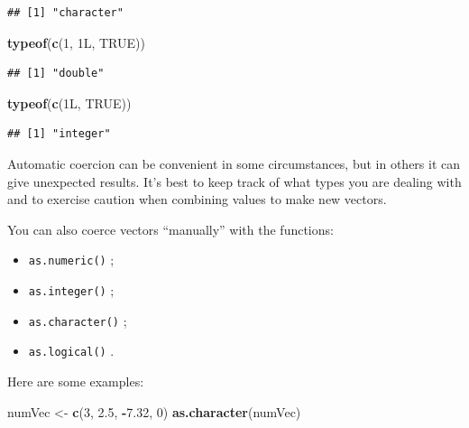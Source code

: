 \documentclass[]{book}
\makeatletter
\newenvironment{Shaded}{\begin{snugshade}}{\end{snugshade}}
\newcommand{\KeywordTok}[1]{\textcolor[rgb]{0.13,0.29,0.53}{\textbf{#1}}}
\newcommand{\DecValTok}[1]{\textcolor[rgb]{0.00,0.00,0.81}{#1}}
\newcommand{\FloatTok}[1]{\textcolor[rgb]{0.00,0.00,0.81}{#1}}
\newcommand{\StringTok}[1]{\textcolor[rgb]{0.31,0.60,0.02}{#1}}
\newcommand{\OtherTok}[1]{\textcolor[rgb]{0.56,0.35,0.01}{#1}}
\newcommand{\OperatorTok}[1]{\textcolor[rgb]{0.81,0.36,0.00}{\textbf{#1}}}
\newcommand{\NormalTok}[1]{#1}
\providecommand{\tightlist}{%
  \setlength{\itemsep}{0pt}\setlength{\parskip}{0pt}}
\newenvironment{kframe}{%
\medskip{}
\setlength{\fboxsep}{.8em}
 \def\at@end@of@kframe{}%
 \ifinner\ifhmode%
  \def\at@end@of@kframe{\end{minipage}}%
  \begin{minipage}{\columnwidth}%
 \fi\fi%
 \def\FrameCommand##1{\hskip\@totalleftmargin \hskip-\fboxsep
 \colorbox{shadecolor}{##1}\hskip-\fboxsep
     \hskip-\linewidth \hskip-\@totalleftmargin \hskip\columnwidth}%
 \MakeFramed {\advance\hsize-\width
   \@totalleftmargin\z@ \linewidth\hsize
   \@setminipage}}%
 {\par\unskip\endMakeFramed%
 \at@end@of@kframe}
\renewenvironment{Shaded}{\begin{kframe}}{\end{kframe}}
\theoremstyle{definition}
\theoremstyle{definition}
\theoremstyle{definition}
\theoremstyle{remark}
\makeatother
\begin{document}
\begin{verbatim}
## [1] "character"
\end{verbatim}

\begin{Shaded}
\begin{Highlighting}[]
\KeywordTok{typeof}\NormalTok{(}\KeywordTok{c}\NormalTok{(}\DecValTok{1}\NormalTok{, 1L, }\OtherTok{TRUE}\NormalTok{))}
\end{Highlighting}
\end{Shaded}

\begin{verbatim}
## [1] "double"
\end{verbatim}

\begin{Shaded}
\begin{Highlighting}[]
\KeywordTok{typeof}\NormalTok{(}\KeywordTok{c}\NormalTok{(1L, }\OtherTok{TRUE}\NormalTok{))}
\end{Highlighting}
\end{Shaded}

\begin{verbatim}
## [1] "integer"
\end{verbatim}

Automatic coercion can be convenient in some circumstances, but in
others it can give unexpected results. It's best to keep track of what
types you are dealing with and to exercise caution when combining values
to make new vectors.

You can also coerce vectors ``manually'' with the functions:

\begin{itemize}
\tightlist
\item
  \texttt{as.numeric()}
  ;
\item
  \texttt{as.integer()}
  ;
\item
  \texttt{as.character()}
  ;
\item
  \texttt{as.logical()}
  .
\end{itemize}

Here are some examples:

\begin{Shaded}
\begin{Highlighting}[]
\NormalTok{numVec <-}\StringTok{ }\KeywordTok{c}\NormalTok{(}\DecValTok{3}\NormalTok{, }\FloatTok{2.5}\NormalTok{, }\OperatorTok{-}\FloatTok{7.32}\NormalTok{, }\DecValTok{0}\NormalTok{)}
\KeywordTok{as.character}\NormalTok{(numVec)}
\end{Highlighting}
\end{Shaded}
\end{document}

